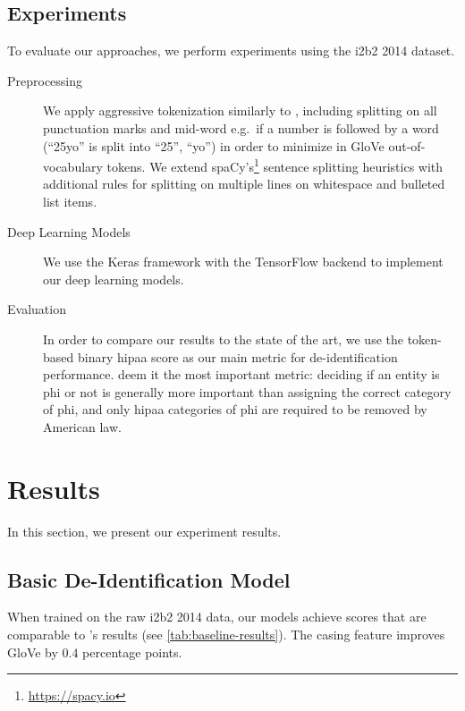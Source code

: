 \subsection{Experiments}
%
To evaluate our approaches, we perform experiments using the i2b2 2014 dataset.
%

\begin{description}
    \item[Preprocessing]
    We apply aggressive tokenization similarly to \citet{liu2017identification}, including splitting on all punctuation marks and mid-word e.g.\ if a number is followed by a word (``25yo'' is split into ``25'', ``yo'') in order to minimize in GloVe out-of-vocabulary tokens.
    We extend spaCy's\footnote{\url{https://spacy.io}} sentence splitting heuristics with additional rules for splitting on multiple lines on whitespace and bulleted list items.
    
    \item[Deep Learning Models]
    We use the Keras framework \citep{chollet2015keras} with the TensorFlow backend \citep{abadi2015tensorflow} to implement our deep learning models.
    
    \item[Evaluation]
    In order to compare our results to the state of the art, we use the token-based binary \ac{hipaa} \fone score as our main metric for de-identification performance.
    \citet{dernoncourt2017identification} deem it the most important metric: deciding if an entity is \ac{phi} or not is generally more important than assigning the correct category of \ac{phi}, and only \ac{hipaa} categories of \ac{phi} are required to be removed by American law.
\end{description}

\section{Results}
%
In this section, we present our experiment results.

\subsection{Basic De-Identification Model}
%
When trained on the raw i2b2 2014 data, our models achieve \fone scores that are comparable to \citeauthor{dernoncourt2017identification}'s results (see \cref{tab:baseline-results}).
%
The casing feature improves GloVe by $0.4$ percentage points.

